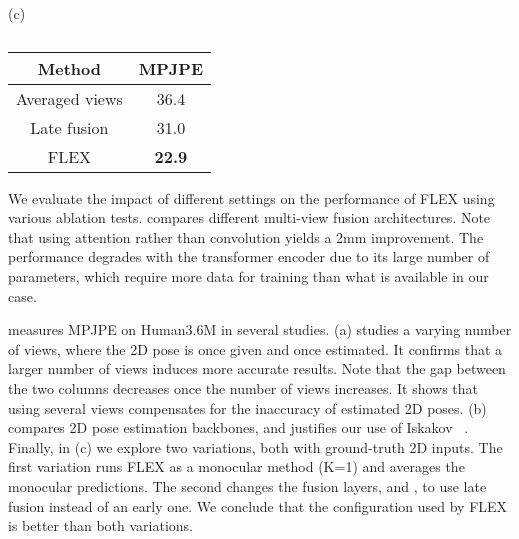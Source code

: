 {\begin{table}[t]
\begin{minipage}{.32\linewidth}
\begin{center}
\begin{tabular}{|c|c|}
\end{tabular}
\end{center}
         \label{tab:2D_backbone}
    \end{minipage}
    \hfill
    \begin{minipage}{.32\linewidth}
\setlength{\abovecaptionskip}{-11pt plus 3pt minus 2pt}
\setlength{\belowcaptionskip}{-21pt plus 3pt minus 2pt}
        \centering
\caption*{\small(c)}
        \begin{center}
\begin{tabular}{|c|c|}
\hline
\textbf{Method} & \textbf{MPJPE } \\
\hline
Averaged  views & 36.4 \\
\hline
Late fusion & 31.0 \\
\hline
FLEX & \textbf{22.9} \\
\hline
\end{tabular}
\end{center}         \label{tab:ablation}
    \end{minipage}
\setlength{\abovecaptionskip}{-35pt plus 3pt minus 2pt}
\setlength{\belowcaptionskip}{-0pt plus 3pt minus 2pt}
\caption*{}
\end{table}
 }
\else{
    
    
}
\fi

We evaluate the impact of different settings on the performance of FLEX using various ablation tests. 
 compares different multi-view fusion architectures.  
Note that using attention rather than convolution yields a 2mm improvement.
The performance degrades with the transformer encoder due to its large number of parameters, which require more data for training than what is available in our case.

 measures MPJPE on Human3.6M in several studies.
(a) studies a varying number of views, where the 2D pose is once given and once estimated. It confirms that a larger number of views induces more accurate results. Note that the gap between the two columns decreases once the number of views increases. It shows that using several views compensates for the inaccuracy of estimated 2D poses. 
(b) compares 2D pose estimation backbones, and justifies our use of Iskakov \etal~\cite{iskakov2019learnable}.
Finally, in (c) we explore
two variations, both with ground-truth 2D inputs. 
The first variation runs FLEX as a monocular method (K=1) and averages the monocular predictions.
The second changes the fusion layers,  and , to use late fusion instead of an early one. 
We conclude that the configuration used by FLEX is better than both variations.


